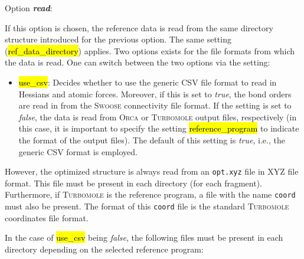 \documentclass[]{tufte-book}
\begin{document}
Option \textit{\textbf{read}}:

If this option is chosen, the reference data is read from the same directory structure introduced for the previous option. The same setting (\hl{ref\_data\_directory}) applies. Two options exists for the file formats from which the data is read. One can switch between the two options via the setting:
\begin{itemize}
\item \hl{use\_csv}: Decides whether to use the generic CSV file format to read in Hessians and atomic forces. Moreover, if this is set to \textit{true}, the bond orders are read in from the \textsc{Swoose} connectivity file format. If the setting is set to \textit{false}, the data is read from \textsc{Orca} or \textsc{Turbomole} output files, respectively (in this case, it is important to specify the setting \hl{reference\_program} to indicate the format of the output files). The default of this setting is \textit{true}, i.e., the generic CSV format is employed.
\end{itemize}
However, the optimized structure is always read from an 
\texttt{opt.xyz} file in XYZ file format. This file must be present in each
directory (for each fragment). Furthermore, if \textsc{Turbomole} is the reference program, a file with the name \texttt{coord} must also be present. The format of this \texttt{coord} file is the standard \textsc{Turbomole} coordinates file format.

In the case of \hl{use\_csv} being \textit{false}, the following files must be present in each directory depending on the selected reference program: 
\end{document}
